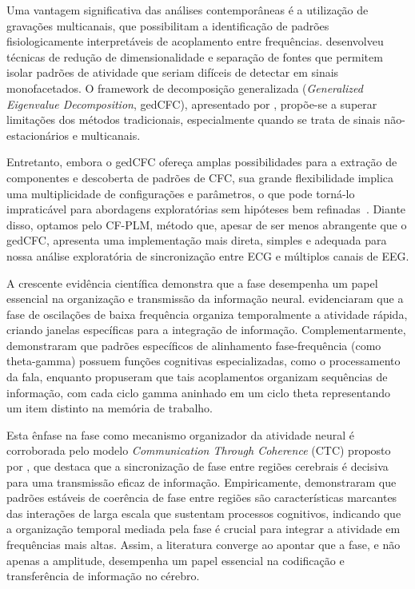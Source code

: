 Uma vantagem significativa das análises contemporâneas é a utilização de gravações multicanais, que possibilitam a identificação de padrões fisiologicamente interpretáveis de acoplamento entre frequências.  desenvolveu técnicas de redução de dimensionalidade e separação de fontes que permitem isolar padrões de atividade que seriam difíceis de detectar em sinais monofacetados. O framework de decomposição generalizada (\textit{Generalized Eigenvalue Decomposition}, gedCFC), apresentado por , propõe-se a superar limitações dos métodos tradicionais, especialmente quando se trata de sinais não-estacionários e multicanais.

Entretanto, embora o gedCFC ofereça amplas possibilidades para a extração de componentes e descoberta de padrões de CFC, sua grande flexibilidade implica uma multiplicidade de configurações e parâmetros, o que pode torná-lo impraticável para abordagens exploratórias sem hipóteses bem refinadas~\cite{cohen2017multivariate}. Diante disso, optamos pelo CF-PLM, método que, apesar de ser menos abrangente que o gedCFC, apresenta uma implementação mais direta, simples e adequada para nossa análise exploratória de sincronização entre ECG e múltiplos canais de EEG.

A crescente evidência científica demonstra que a fase desempenha um papel essencial na organização e transmissão da informação neural.  evidenciaram que a fase de oscilações de baixa frequência organiza temporalmente a atividade rápida, criando janelas específicas para a integração de informação. Complementarmente,  demonstraram que padrões específicos de alinhamento fase-frequência (como theta-gamma) possuem funções cognitivas especializadas, como o processamento da fala, enquanto  propuseram que tais acoplamentos organizam sequências de informação, com cada ciclo gamma aninhado em um ciclo theta representando um item distinto na memória de trabalho.

Esta ênfase na fase como mecanismo organizador da atividade neural é corroborada pelo modelo \textit{Communication Through Coherence} (CTC) proposto por , que destaca que a sincronização de fase entre regiões cerebrais é decisiva para uma transmissão eficaz de informação. Empiricamente,  demonstraram que padrões estáveis de coerência de fase entre regiões são características marcantes das interações de larga escala que sustentam processos cognitivos, indicando que a organização temporal mediada pela fase é crucial para integrar a atividade em frequências mais altas. Assim, a literatura converge ao apontar que a fase, e não apenas a amplitude, desempenha um papel essencial na codificação e transferência de informação no cérebro.

